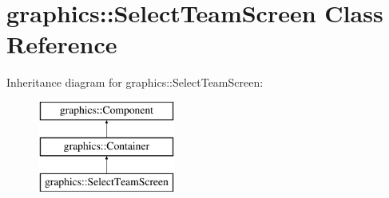 \hypertarget{classgraphics_1_1_select_team_screen}{\section{graphics\-:\-:Select\-Team\-Screen Class Reference}
\label{classgraphics_1_1_select_team_screen}
}
Inheritance diagram for graphics\-:\-:Select\-Team\-Screen\-:\begin{figure}[H]
\begin{center}
\leavevmode
\includegraphics[height=3.000000cm]{classgraphics_1_1_select_team_screen}
\end{center}
\end{figure}
